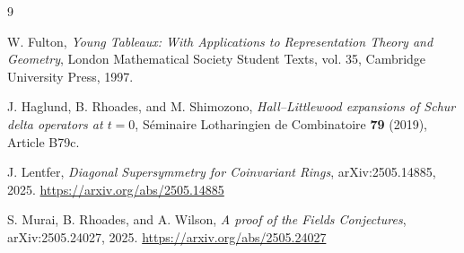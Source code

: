 \documentclass[12pt]{article}
\begin{document}
\begin{thebibliography}{9}

W. Fulton,
\emph{Young Tableaux: With Applications to Representation Theory and Geometry},
London Mathematical Society Student Texts, vol. 35,
Cambridge University Press, 1997.

J. Haglund, B. Rhoades, and M. Shimozono,
\emph{Hall--Littlewood expansions of Schur delta operators at \(t=0\)},
S\'eminaire Lotharingien de Combinatoire \textbf{79} (2019), Article B79c.

J. Lentfer,
\emph{Diagonal Supersymmetry for Coinvariant Rings},
arXiv:2505.14885, 2025.
\url{https://arxiv.org/abs/2505.14885}

S. Murai, B. Rhoades, and A. Wilson,
\emph{A proof of the Fields Conjectures},
arXiv:2505.24027, 2025.
\url{https://arxiv.org/abs/2505.24027}

\end{thebibliography}
\end{document}
